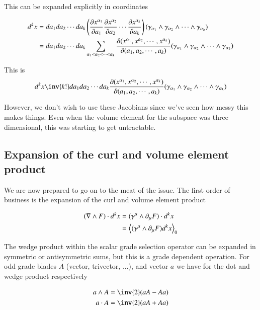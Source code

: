 This can be expanded explicitly in coordinates

\begin{align*}
d^k x 
&= da_1 da_2 \cdots da_k 
\left(
\PD{a_1}{x^{\alpha_1}} 
\PD{a_2}{x^{\alpha_2}} 
\cdots
\PD{a_k}{x^{\alpha_k}} 
\right)
( \gamma_{\alpha_1} \wedge \gamma_{\alpha_2} \wedge \cdots \wedge \gamma_{\alpha_k} ) \\
&= 
da_1 da_2 \cdots da_k 
\sum_{\alpha_1 < \alpha_2 < \cdots < \alpha_k}
\PD{(a_1, a_2, \cdots, a_k)}{(x^{\alpha_1}, x^{\alpha_2}, \cdots, x^{\alpha_k})}
( \gamma_{\alpha_1} \wedge \gamma_{\alpha_2} \wedge \cdots \wedge \gamma_{\alpha_k} ) \\
\end{align*}

This is
\begin{align}\label{eqn:jacobian}
d^k x 
\inv{k!}
da_1 da_2 \cdots da_k
\PD{(a_1, a_2, \cdots, a_k)}{(x^{\alpha_1}, x^{\alpha_2}, \cdots, x^{\alpha_k})}
( \gamma_{\alpha_1} \wedge \gamma_{\alpha_2} \wedge \cdots \wedge \gamma_{\alpha_k} ) 
\end{align}

However, we don't wish to use these Jacobians since we've seen how messy this makes things.  Even when the volume element for the subspace was three dimensional, this was starting to get untractable.

\subsection{Expansion of the curl and volume element product}

We are now prepared to go on to the meat of the issue.  The first order of business is the expansion of the curl and volume element product

\begin{align*}
( \grad \wedge F ) \cdot d^k x
&=
( \gamma^\mu \wedge \partial_\mu F ) \cdot d^k x \\
&=
\gpgradezero{ ( \gamma^\mu \wedge \partial_\mu F ) d^k x } \\
\end{align*}

The wedge product within the scalar grade selection operator can be expanded in symmetric or antisymmetric sums, but this is a grade dependent operation.  For odd grade blades $A$ (vector, trivector, ...), and vector $a$ we have for the dot and wedge product respectively

\begin{align*}
a \wedge A = \inv{2} (a A - A a) \\
a \cdot A = \inv{2} (a A + A a)
\end{align*}

